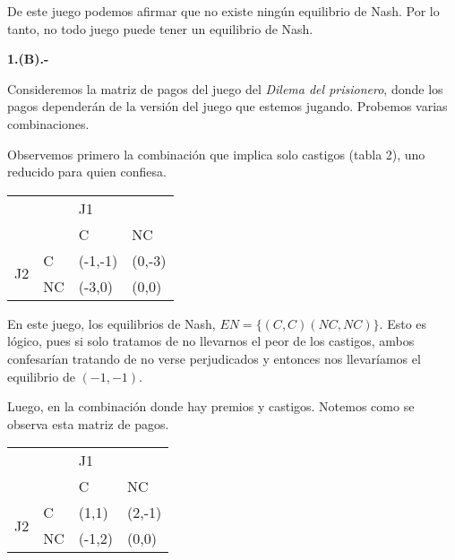 \documentclass{homework}
\begin{document}
De este juego podemos afirmar que no existe ningún equilibrio de Nash. Por lo tanto, no todo juego puede tener un equilibrio de Nash.




\textbf{1.(B).-}

Consideremos la matriz de pagos del juego del \textit{Dilema del prisionero}, donde los pagos dependerán de la versión del juego que estemos jugando. Probemos varias combinaciones. 

Observemos primero la combinación que implica solo castigos (tabla 2), uno reducido para quien confiesa.

\begin{table}[h!]
\begin{tabular}{|ll|ll|}
\hline
\multicolumn{2}{|l|}{\multirow{2}{*}{}} & \multicolumn{2}{l|}{J1} \\ \cline{3-4} 
\multicolumn{2}{|l|}{} & \multicolumn{1}{l|}{C} & NC \\ \hline
\multicolumn{1}{|c|}{\multirow{2}{*}{J2}} & C & \multicolumn{1}{l|}{(-1,-1)} & (0,-3) \\ \cline{2-4} 
\multicolumn{1}{|c|}{} & NC & \multicolumn{1}{l|}{(-3,0)} & (0,0) \\ \hline

\end{tabular}
\end{table}

En este juego, los equilibrios de Nash, $EN = \{ (C,C) (NC, NC) \}$. Esto es lógico, pues si solo tratamos de no llevarnos el peor de los castigos, ambos confesarían tratando de no verse perjudicados y entonces nos llevaríamos el equilibrio de $(-1, -1)$. 

Luego, en la combinación donde hay premios y castigos. Notemos como se observa esta matriz de pagos.

\begin{table}[h!]
\begin{tabular}{|ll|ll|}
\hline
\multicolumn{2}{|l|}{\multirow{2}{*}{}} & \multicolumn{2}{l|}{J1} \\ \cline{3-4} 
\multicolumn{2}{|l|}{} & \multicolumn{1}{l|}{C} & NC \\ \hline
\multicolumn{1}{|c|}{\multirow{2}{*}{J2}} & C & \multicolumn{1}{l|}{(1,1)} & (2,-1) \\ \cline{2-4} 
\multicolumn{1}{|c|}{} & NC & \multicolumn{1}{l|}{(-1,2)} & (0,0) \\ \hline
\end{tabular}
\end{table}
\end{document}
